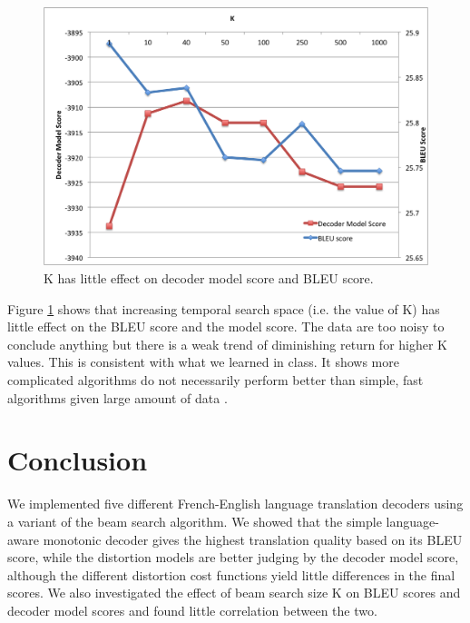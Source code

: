 \documentclass[12pt]{article}   %
\begin{document}
\begin{figure}[h*]
	\centering
	\includegraphics[width=12cm]{k-score}
	\caption{K has little effect on decoder model score and BLEU score.}
	\label{fig:kscore}
\end{figure}

Figure \ref{fig:kscore} shows that increasing temporal search space (i.e. the value of K) has little effect on the BLEU score and the model score. The data are too noisy to conclude anything but there is a weak trend of diminishing return for higher K values. This is consistent with what we learned in class. It shows more complicated algorithms do not necessarily perform better than simple, fast algorithms given large amount of data \cite{dataeffect}.


\section{Conclusion}
We implemented five different French-English language translation decoders using a variant of the beam search algorithm. We showed that the simple language-aware monotonic decoder gives the highest translation quality based on its BLEU score, while the distortion models are better judging by the decoder model score, although the different distortion cost functions yield little differences in the final scores. We also investigated the effect of beam search size K on BLEU scores and decoder model scores and found little correlation between the two.




\end{document}
